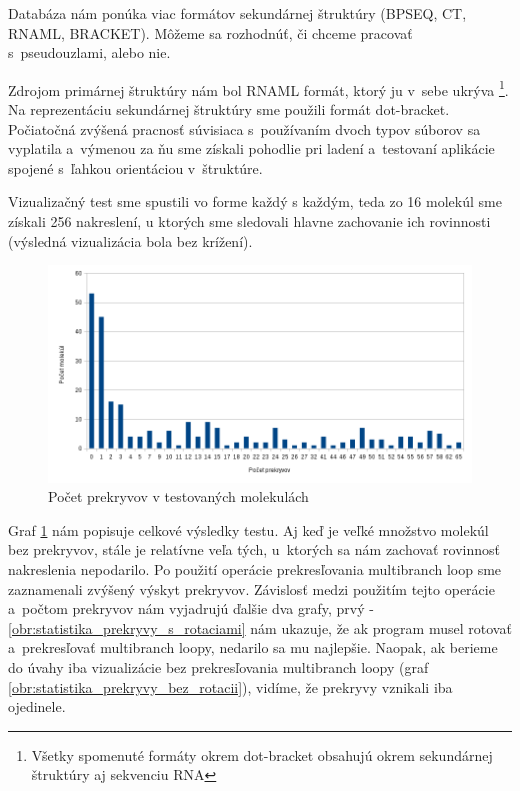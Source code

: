 Databáza nám ponúka viac formátov sekundárnej štruktúry (BPSEQ, CT, RNAML, BRACKET).
Môžeme sa rozhodnúť, či chceme pracovať s~pseudouzlami, alebo nie.

Zdrojom primárnej štruktúry nám bol RNAML formát, ktorý ju v~sebe ukrýva%
\footnote{Všetky spomenuté formáty okrem dot-bracket obsahujú okrem
sekundárnej štruktúry aj sekvenciu RNA}.
Na reprezentáciu sekundárnej štruktúry sme použili formát dot-bracket.
Počiatočná zvýšená pracnosť súvisiaca s~používaním dvoch typov súborov
sa vyplatila a~výmenou za ňu sme získali pohodlie pri ladení a~testovaní
aplikácie spojené s~ľahkou orientáciou v~štruktúre.

Vizualizačný test sme spustili vo forme každý s každým, teda zo
16 molekúl sme získali 256 nakreslení, u ktorých sme sledovali
hlavne zachovanie ich rovinnosti (výsledná vizualizácia bola bez krížení).

\begin{figure}
  \includegraphics[width=1\textwidth]{../img/statistika/prekryvy-pocetmolekul}
  \caption{Počet prekryvov v testovaných molekulách}
  \label{obr:statistika_prekryvy}
\end{figure}

Graf \ref{obr:statistika_prekryvy} nám popisuje celkové výsledky testu.
Aj keď je veľké množstvo molekúl bez prekryvov, stále je relatívne veľa tých,
u~ktorých sa nám zachovať rovinnosť nakreslenia nepodarilo.
Po použití operácie prekresľovania multibranch loop sme zaznamenali
zvýšený výskyt prekryvov. Závislosť medzi použitím tejto operácie
a~počtom prekryvov nám vyjadrujú ďalšie dva grafy,
prvý - \ref{obr:statistika_prekryvy_s_rotaciami} nám ukazuje, že ak
program musel rotovať a~prekresľovať multibranch loopy,
nedarilo sa mu najlepšie. Naopak, ak berieme do úvahy iba vizualizácie bez
prekresľovania multibranch loopy (graf \ref{obr:statistika_prekryvy_bez_rotacii}),
vidíme, že prekryvy vznikali iba ojedinele.

